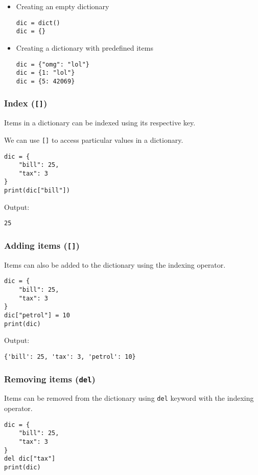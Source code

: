 \documentclass[11pt]{article}
\begin{document}
\begin{itemize}
\item Creating an empty dictionary
\begin{verbatim}
dic = dict()
dic = {}
\end{verbatim}

\item Creating a dictionary with predefined items
\begin{verbatim}
dic = {"omg": "lol"}
dic = {1: "lol"}
dic = {5: 42069}
\end{verbatim}
\end{itemize}

 \newpage

\subsubsection{Index (\texttt{[]})}
\label{sec:orgb8b1d03}
Items in a dictionary can be indexed using its respective key.

We can use \texttt{[]} to access particular values in a dictionary.
\begin{verbatim}
dic = {
    "bill": 25,
    "tax": 3
}
print(dic["bill"])
\end{verbatim}

 \noindent Output:

\begin{verbatim}
25
\end{verbatim}

\subsubsection{Adding items (\texttt{[]})}
\label{sec:org1ba86c3}
Items can also be added to the dictionary using the indexing operator.
\begin{verbatim}
dic = {
    "bill": 25,
    "tax": 3
}
dic["petrol"] = 10
print(dic)
\end{verbatim}

 \noindent Output:

\begin{verbatim}
{'bill': 25, 'tax': 3, 'petrol': 10}
\end{verbatim}

\subsubsection{Removing items (\texttt{del})}
\label{sec:org5723b2a}
Items can be removed from the dictionary using \texttt{del} keyword with the indexing operator.
\begin{verbatim}
dic = {
    "bill": 25,
    "tax": 3
}
del dic["tax"]
print(dic)
\end{verbatim}
\end{document}
